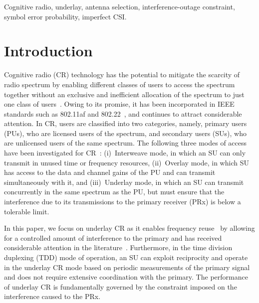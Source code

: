 \documentclass[12pt,draftcls,peerreview,onecolumn]{IEEEtran}
\begin{document}
\begin{IEEEkeywords}
Cognitive radio, underlay, antenna selection, interference-outage constraint, symbol error probability, imperfect CSI.
\end{IEEEkeywords}

\IEEEpeerreviewmaketitle



\section{Introduction}	
\label{sec:intro}

Cognitive radio (CR) technology has the potential to mitigate the scarcity of radio spectrum by enabling different classes of users to access the spectrum together without an exclusive and inefficient allocation of the spectrum to just one class of users~\cite{Goldsmith_2009_PIEEE}. Owing to its promise, it has been incorporated in IEEE standards such as 802.11af and 802.22~\cite{Sherman_2008_TCMAG}, and continues to attract considerable attention. In CR, users are classified into two categories, namely,   primary users (PUs), who are licensed users of the spectrum, and  secondary users (SUs), who are unlicensed users of the same spectrum. The following three modes of access have been investigated for CR~\cite{Goldsmith_2009_PIEEE}: (i)~Interweave mode, in which an SU can only transmit in unused time or frequency resources, (ii)~Overlay mode, in which SU has access to the data and channel gains of the  PU and can transmit simultaneously with it, and (iii)~Underlay mode, in which an SU can transmit concurrently in the same spectrum as the PU, but must ensure that the interference due to its transmissions to the primary receiver (PRx) is below a tolerable limit. 

In this paper, we focus on underlay CR as it enables frequency reuse~\cite{Zhang_2017_tcom} by allowing for a controlled amount of interference to the primary and has received considerable attention in the literature~\cite{Hanif_2015_globecom,Wang_2010_TWC,RZhang_2009_TWC,Sarvendranath_2013_TCOM,Wang_2011_TCom,Sarvendranath_2014_TCOM, Kashyap_2014_TCOM,Kong_2011_JCN,Fakhan_2014_TSP,Hanif_2017_tcom,Sboui_2013_TWC,Kashyap_2015_wicomlet,li_2011_pimrc}. Furthermore, in the time division duplexing (TDD) mode of operation, an SU can exploit reciprocity and operate in the underlay CR mode based on periodic measurements of the primary signal and does not require extensive coordination with the primary. The performance of underlay CR is fundamentally governed by the constraint imposed on the interference caused to the PRx. 
\end{document}
